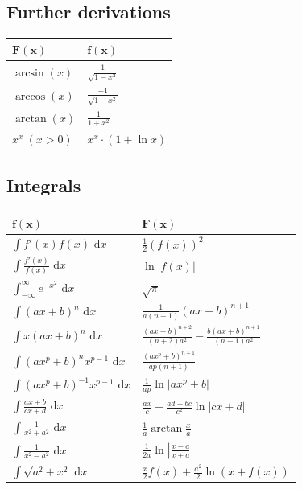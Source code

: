 \documentclass[a4paper,fontsize = 10pt]{article}
\def\dx{\text{ d}x}
\begin{document}
\subsection*{Further derivations}
\begin{center}
  \begin{tabularx}{\linewidth}{>{\centering\arraybackslash}X>{\centering\arraybackslash}X}
    \toprule
    $\mathbf{F(x)}$ & $\mathbf{f(x)}$ \\
    \midrule
    $\arcsin(x)$ & $\frac{1}{\sqrt{1 - x^2}}$ \\
    $\arccos(x)$ & $\frac{-1}{\sqrt{1 - x^2}}$ \\
    $\arctan(x)$ & $\frac{1}{1 + x^2}$ \\ 
    $x^x \ (x > 0)$ & $x^x \cdot (1 + \ln x)$ \\
    \bottomrule
  \end{tabularx}
\end{center}
\subsection*{Integrals}
\begin{center}
  \begin{tabularx}{\linewidth}{>{\centering\arraybackslash}X>{\centering\arraybackslash}X}
    \toprule
    $\mathbf{f(x)}$ & $\mathbf{F(x)}$ \\
    \midrule
    $\int f'(x) f(x) \dx$ & $\frac{1}{2}(f(x))^2$ \\
    $\int \frac{f'(x)}{f(x)} \dx$ & $\ln|f(x)|$ \\
    $\int_{-\infty}^\infty e^{-x^2} \dx$ & $\sqrt{\pi}$ \\
    $\int (ax+b)^n \dx$ & $\frac{1}{a(n+1)}(ax+b)^{n+1}$ \\
    $\int x(ax+b)^n \dx$ & $\frac{(ax+b)^{n+2}}{(n+2)a^2} - \frac{b(ax+b)^{n+1}}{(n+1)a^2}$ \\
    $\int (ax^p+b)^n x^{p-1} \dx$ & $\frac{(ax^p+b)^{n+1}}{ap(n+1)}$ \\
    $\int (ax^p + b)^{-1} x^{p-1} \dx$ & $\frac{1}{ap} \ln |ax^p + b|$ \\
    $\int \frac{ax+b}{cx+d} \dx$ & $\frac{ax}{c} - \frac{ad-bc}{c^2} \ln |cx +d|$ \\
    $\int \frac{1}{x^2+a^2} \dx$ & $\frac{1}{a} \arctan \frac{x}{a}$ \\
    $\int \frac{1}{x^2 - a^2} \dx$ & $\frac{1}{2a} \ln\left| \frac{x-a}{x+a} \right|$ \\
    $\int \sqrt{a^2+x^2} \dx $ & $\frac{x}{2}f(x) + \frac{a^2}{2}\ln(x+f(x))$ \\
    \bottomrule
  \end{tabularx}
\end{center}
\end{document}
